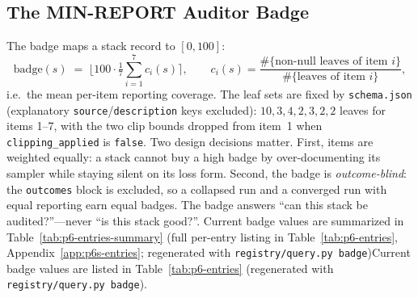 \subsection{The MIN-REPORT Auditor Badge}
\label{sec:p6-badge}
The badge maps a stack record to $[0,100]$:
\begin{equation}
  \mathrm{badge}(s) \;=\;
  \Big\lfloor 100 \cdot \tfrac{1}{7}\textstyle\sum_{i=1}^{7}
  c_i(s) \Big\rceil,
  \qquad
  c_i(s) = \frac{\#\{\text{non-null leaves of item } i\}}
                {\#\{\text{leaves of item } i\}},
  \label{eq:p6-badge}
\end{equation}
i.e.\ the mean per-item reporting coverage. The leaf sets are fixed by
\texttt{schema.json} (explanatory \texttt{source}/\texttt{description} keys
excluded): $10, 3, 4, 2, 3, 2, 2$ leaves for items 1--7, with the two clip
bounds dropped from item~1 when \texttt{clipping\_applied} is \texttt{false}.
Two design decisions matter.
First, items are weighted equally: a stack cannot buy a high badge by
over-documenting its sampler while staying silent on its loss form. Second,
the badge is \emph{outcome-blind}: the \texttt{outcomes} block is excluded, so
a collapsed run and a converged run with equal reporting earn equal badges.
The badge answers ``can this stack be audited?''---never ``is this stack
good?''. \ifdefined\SUBMISSIONBUILD Current badge values are summarized in Table~\ref{tab:p6-entries-summary} (full per-entry listing in Table~\ref{tab:p6-entries}, Appendix~\ref{app:p6s-entries}; regenerated with \texttt{registry/query.py badge})\else Current badge values are listed in Table~\ref{tab:p6-entries}
(regenerated with \texttt{registry/query.py badge})\fi{}.

